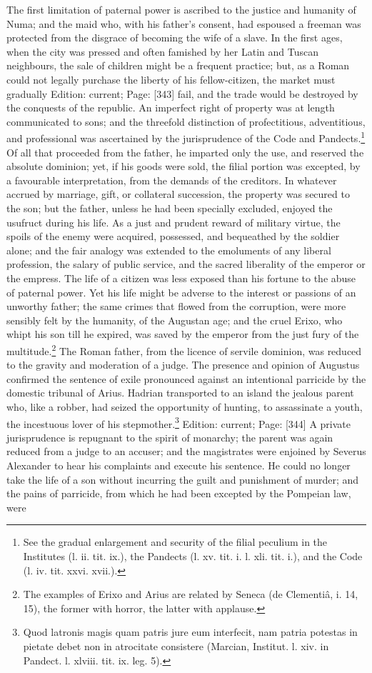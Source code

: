 The first limitation of paternal power is ascribed to the justice and humanity of Numa; and the maid who, with his father\texthebrew{}’s consent, had espoused a freeman was protected from the disgrace of becoming the wife of a slave. In the first ages, when the city was pressed and often famished by her Latin and Tuscan neighbours, the sale of children might be a frequent practice; but, as a Roman could not legally purchase the liberty of his fellow-citizen, the market must gradually Edition: current; Page: [343] fail, and the trade would be destroyed by the conquests of the republic. An imperfect right of property was at length communicated to sons; and the threefold distinction of profectitious, adventitious, and professional was ascertained by the jurisprudence of the Code and Pandects.\footnote{See the gradual enlargement and security of the filial peculium in the Institutes (l. ii. tit. ix.), the Pandects (l. xv. tit. i. l. xli. tit. i.), and the Code (l. iv. tit. xxvi. xvii.).} Of all that proceeded from the father, he imparted only the use, and reserved the absolute dominion; yet, if his goods were sold, the filial portion was excepted, by a favourable interpretation, from the demands of the creditors. In whatever accrued by marriage, gift, or collateral succession, the property was secured to the son; but the father, unless he had been specially excluded, enjoyed the usufruct during his life. As a just and prudent reward of military virtue, the spoils of the enemy were acquired, possessed, and bequeathed by the soldier alone; and the fair analogy was extended to the emoluments of any liberal profession, the salary of public service, and the sacred liberality of the emperor or the empress. The life of a citizen was less exposed than his fortune to the abuse of paternal power. Yet his life might be adverse to the interest or passions of an unworthy father; the same crimes that flowed from the corruption, were more sensibly felt by the humanity, of the Augustan age; and the cruel Erixo, who whipt his son till he expired, was saved by the emperor from the just fury of the multitude.\footnote{The examples of Erixo and Arius are related by Seneca (de Clementiâ, i. 14, 15), the former with horror, the latter with applause.} The Roman father, from the licence of servile dominion, was reduced to the gravity and moderation of a judge. The presence and opinion of Augustus confirmed the sentence of exile pronounced against an intentional parricide by the domestic tribunal of Arius. Hadrian transported to an island the jealous parent who, like a robber, had seized the opportunity of hunting, to assassinate a youth, the incestuous lover of his stepmother.\footnote{Quod latronis magis quam patris jure eum interfecit, nam patria potestas in pietate debet non in atrocitate consistere (Marcian, Institut. l. xiv. in Pandect. l. xlviii. tit. ix. leg. 5).} Edition: current; Page: [344] A private jurisprudence is repugnant to the spirit of monarchy; the parent was again reduced from a judge to an accuser; and the magistrates were enjoined by Severus Alexander to hear his complaints and execute his sentence. He could no longer take the life of a son without incurring the guilt and punishment of murder; and the pains of parricide, from which he had been excepted by the Pompeian law, were 